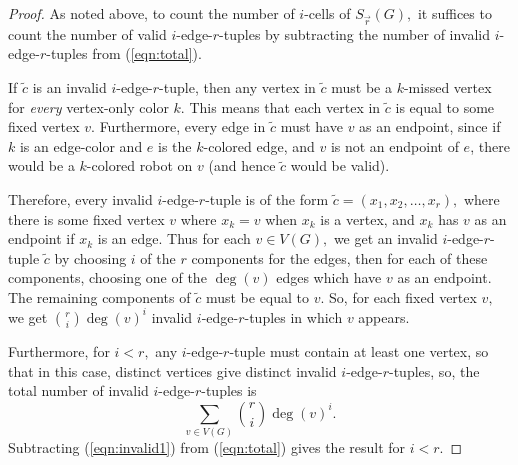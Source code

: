 \documentclass{amsart}
\newcommand{\Sr}{S_{\vec{r}}}
\newcommand{\Z}{\mathbb{Z}}
\newtheorem{thm}{Theorem}[section]
\theoremstyle{definition}
\theoremstyle{remark}
\begin{document}

\begin{proof}
As noted above, to count the number of $i$-cells of $\Sr(G),$ it suffices to count the number of valid $i$-edge-$r$-tuples by subtracting the number of invalid $i$-edge-$r$-tuples from (\ref{eqn:total}).

If $\tilde c$ is an invalid $i$-edge-$r$-tuple, then any vertex in $\tilde c$ must be a $k$-missed vertex for \textit{every} vertex-only color $k$. This means that each vertex in $\tilde c$ is equal to some fixed vertex $v.$ Furthermore, every edge in $\tilde c$ must have $v$ as an endpoint, since if $k$ is an edge-color and $e$ is the $k$-colored edge, and $v$ is not an endpoint of $e$, there would be  a $k$-colored robot on $v$ (and hence $\tilde c$ would be valid).


Therefore, every invalid $i$-edge-$r$-tuple is of the form $\tilde c=(x_1,x_2,\dots,x_r),$ where there is some fixed vertex $v$ where $x_k=v$ when $x_k$ is a vertex, and $x_k$ has $v$ as an endpoint if $x_k$ is an edge. Thus for each $v\in V(G),$ we get an invalid $i$-edge-$r$-tuple $\tilde c$ by choosing $i$ of the $r$ components for the edges, then for each of these components, choosing one of the $\deg(v)$ edges which have $v$ as an endpoint. The remaining components of $\tilde c$ must be equal to $v.$ So, for each fixed vertex $v,$ we get $\binom{r}{i}\deg(v)^i$ invalid $i$-edge-$r$-tuples in which $v$ appears.

Furthermore, for $i<r,$ any $i$-edge-$r$-tuple must contain at least one vertex, so that in this case, distinct vertices give distinct invalid $i$-edge-$r$-tuples, so, the total number of invalid $i$-edge-$r$-tuples is 
\begin{equation}\label{eqn:invalid1}
    \sum_{v\in V(G)}\binom{r}{i}\deg(v)^i.
\end{equation}
Subtracting (\ref{eqn:invalid1}) from (\ref{eqn:total}) gives the result for $i<r.$


\end{proof}
\end{document}
